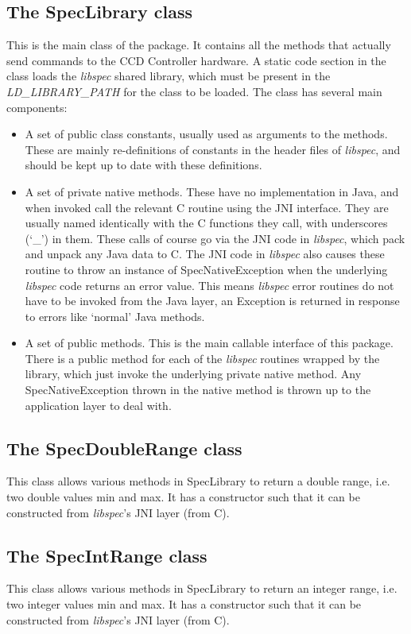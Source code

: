 \documentclass[10pt,a4paper]{article}
\begin{document}
\subsection{The SpecLibrary class}
This is the main class of the package. It contains all the methods that actually send commands to the CCD Controller
hardware. A static code section in the class loads the {\em libspec} shared library, which must be present in the
{\em LD\_LIBRARY\_PATH} for the class to be loaded.
The class has several main components:

\begin{itemize}
\item A set of public class constants, usually used as arguments to the methods. 
	These are mainly re-definitions of constants
	in the header files of {\em libspec}, and should be kept up to date with these definitions.
\item A set of private native methods. These have no implementation in Java, and when invoked call the
	relevant C routine using the JNI interface. They are usually named identically with the C functions they call,
	with underscores (`\_') in them. These calls of course go via the JNI code in {\em libspec}, which pack
	and unpack any Java data to C. The JNI code in {\em libspec} also causes these routine to throw an instance of
	SpecNativeException when the underlying {\em libspec} code returns an error value. This means {\em libspec}
	error routines do not have to be invoked from the Java layer, an Exception is returned in response to errors
	like `normal' Java methods.
\item A set of public methods. This is the main callable interface of this package. There is a public method
	for each of the {\em libspec} routines wrapped by the library, which just invoke the underlying
	private native method. Any SpecNativeException thrown in the native method is thrown up to the application
	layer to deal with.
\end{itemize}

\subsection{The SpecDoubleRange class}
This class allows various methods in SpecLibrary to return a double range, i.e. two double values min and max. 
It has a constructor such that it can be constructed from {\em libspec}'s JNI layer (from C).

\subsection{The SpecIntRange class}
This class allows various methods in SpecLibrary to return an integer range, i.e. two integer values min and max. 
It has a constructor such that it can be constructed from {\em libspec}'s JNI layer (from C).
\end{document}

